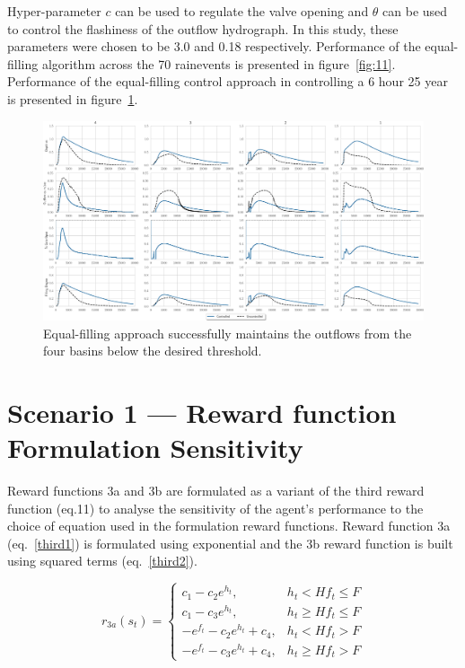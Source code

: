Hyper-parameter $c$ can be used to regulate the valve opening and $\theta$ can be used to control the flashiness of the outflow hydrograph.
In this study, these parameters were chosen to be 3.0 and 0.18 respectively.
Performance of the equal-filling algorithm across the 70 rainevents is presented in figure~\ref{fig:11}.
Performance of the equal-filling control approach in controlling a 6 hour 25 year is presented in figure~\ref{fig:12}.

\begin{figure}[H]
    \centering
    \includegraphics[width=\linewidth]{gfx/Chapter-3/eqf.eps}
    \caption{Equal-filling approach successfully maintains the outflows from the four basins below the desired threshold.}\label{fig:12}
\end{figure}

\section{Scenario 1 --- Reward function Formulation Sensitivity}\label{SI:reward-math}

\noindent Reward functions 3a and 3b are formulated as a variant of the third reward function (eq.11) to analyse the sensitivity of the agent's performance to the choice of equation used in the formulation reward functions.
Reward function 3a (eq.~\ref{third1}) is formulated using exponential and the 3b reward function is built using squared terms (eq.~\ref{third2}).

\begin{equation}
  r_{3a} (s_t) = \left\{ \begin{array}{ll}
    c_1 - c_2 e^{h_t}, & h_t < Hf_t \leq F\\
    c_1 - c_3 e^{h_t}, & h_t \geq Hf_t \leq F\\
    - e^{f_t} - c_2 e^{h_t} + c_4, & h_t < Hf_t > F\\
    - e^{f_t} - c_3 e^{h_t} + c_4, & h_t \geq Hf_t > F
  \end{array} \right.\label{third1}
\end{equation}

